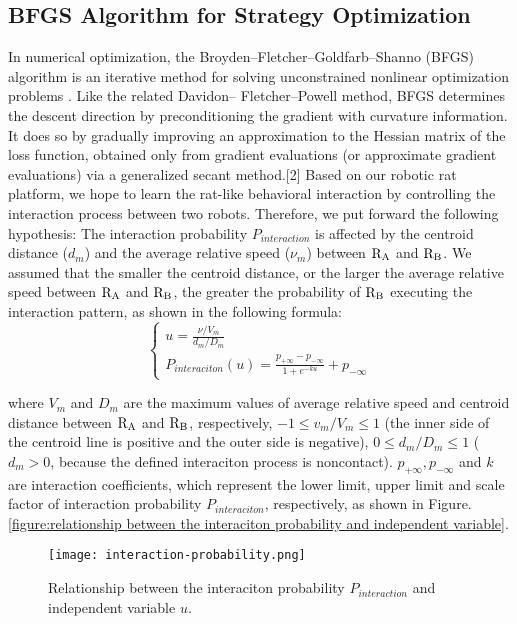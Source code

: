 \subsection{BFGS Algorithm for Strategy Optimization}
In numerical optimization, the Broyden–Fletcher–Goldfarb–Shanno (BFGS) algorithm
is an iterative method for solving unconstrained nonlinear optimization
problems \cite{Practical-Methods-of-Optimization}. Like the related Davidon–
Fletcher–Powell method, BFGS determines
the descent direction by preconditioning the gradient with curvature
information. It does so by gradually improving an approximation to the Hessian
matrix of the loss function, obtained only from gradient evaluations (or
approximate gradient evaluations) via a generalized secant method.[2]
Based on our robotic rat platform, we hope to learn the rat-like behavioral
interaction by controlling the interaction process between two robots. Therefore,
we put forward the following hypothesis: The interaction probability
$P_{interaction}$ is affected by the centroid distance ($d_m$) and the average
relative speed ($\nu_m$) between $\rm R_A$ and $\rm R_B$. We assumed that the
smaller the centroid distance, or the larger the average relative speed between
$\rm R_A$ and $\rm R_B$, the greater the probability of $\rm R_B$ executing the
interaction pattern, as shown in the following formula:
\begin{equation} \label{eq:probability of interaciton}
    \displaystyle\begin{cases}
        u=\displaystyle\frac{\nu/V_m}{d_m/D_m} \\
        P_{interaciton}(u)=\displaystyle\frac{p_{+\infty}-p_{-\infty}}{1+e^{-ku}}
        +p_{-\infty}
    \end{cases}
\end{equation}

where $V_m$ and $D_m$ are the maximum values of average relative speed and
centroid distance between $\rm R_A$ and $\rm R_B$, respectively, $-1\leq
v_m/V_m\leq 1$ (the inner side of the centroid line is positive and the outer
side is negative), $0\leq d_m/D_m\leq 1$ ($d_m>0$, because the defined
interaciton process is noncontact). $p_{+\infty},p_{-\infty}$ and $k$ are
interaction coefficients, which represent the lower limit, upper limit and scale
factor of interaction probability $P_{interaciton}$, respectively, as shown in
Figure. \ref{figure:relationship between the interaciton probability and
independent variable}.
\begin{figure}[h]
    \centering
    \texttt{[image: interaction-probability.png]}
    \caption{Relationship between the interaciton probability $P_{interaction}$
    and independent variable $u$.}
    \label{figure:relationship between the interaciton probability and
    independent variable}
\end{figure}

